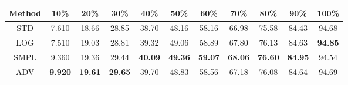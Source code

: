 \documentclass{standalone}
\begin{document}
\begin{tabular}{c|cccccccccc}
      \toprule
      Method & 10\% & 20\% & 30\% & 40\% & 50\% & 60\% & 70\% & 80\% & 90\% & 100\% \\
      \midrule
STD & 7.610 & 18.66 & 28.85 & 38.70 & 48.16 & 58.16 & 66.98 & 75.58 & 84.43 & 94.68\\
LOG & 7.510 & 19.03 & 28.81 & 39.32 & 49.06 & 58.89 & 67.80 & 76.13 & 84.63 & \textbf{94.85}\\
SMPL & 9.360 & 19.36 & 29.44 & \textbf{40.09} & \textbf{49.36} & \textbf{59.07} & \textbf{68.06} & \textbf{76.60} & \textbf{84.95} & 94.54\\
ADV & \textbf{9.920} & \textbf{19.61} & \textbf{29.65} & 39.70 & 48.83 & 58.56 & 67.18 & 76.08 & 84.64 & 94.69\\
  \bottomrule
\end{tabular}
\end{document}
